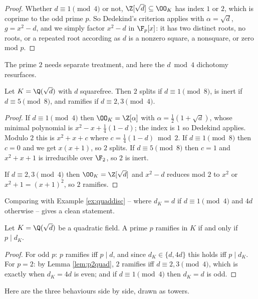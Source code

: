 \begin{proof}
	Whether $d \equiv 1 \pmod 4$ or not, $\Z[\sqrt d] \subseteq \OO_K$ has index $1$ or $2$, which is coprime to the odd prime $p$. So Dedekind's criterion applies with $\alpha = \sqrt d$, $g = x^2-d$, and we simply factor $x^2 - d$ in $\F_p[x]$: it has two distinct roots, no roots, or a repeated root according as $d$ is a nonzero square, a nonsquare, or zero mod $p$.
\end{proof}

The prime $2$ needs separate treatment, and here the $d \bmod 4$ dichotomy resurfaces.

\begin{lemma}\label{lem:p2quad}
	Let $K = \Q(\sqrt d)$ with $d$ squarefree. Then $2$ splits if $d \equiv 1 \pmod 8$, is inert if $d \equiv 5 \pmod 8$, and ramifies if $d \equiv 2,3\pmod 4$.
\end{lemma}

\begin{proof}
	If $d \equiv 1 \pmod 4$ then $\OO_K = \Z[\alpha]$ with $\alpha = \tfrac12(1+\sqrt d)$, whose minimal polynomial is $x^2 - x + \tfrac14(1-d)$; the index is $1$ so Dedekind applies. Modulo $2$ this is $x^2+x+c$ where $c = \tfrac14(1-d) \bmod 2$. If $d \equiv 1 \pmod 8$ then $c = 0$ and we get $x(x+1)$, so $2$ splits. If $d \equiv 5\pmod 8$ then $c = 1$ and $x^2+x+1$ is irreducible over $\F_2$, so $2$ is inert.

	If $d \equiv 2,3\pmod 4$ then $\OO_K = \Z[\sqrt d]$ and $x^2-d$ reduces mod $2$ to $x^2$ or $x^2+1 = (x+1)^2$, so $2$ ramifies.
\end{proof}

Comparing with Example \ref{ex:quaddisc} -- where $d_K = d$ if $d \equiv 1 \pmod 4$ and $4d$ otherwise -- gives a clean statement.

\begin{corollary}\label{cor:quadram}
	Let $K = \Q(\sqrt d)$ be a quadratic field. A prime $p$ ramifies in $K$ if and only if $p \mid d_K$.
\end{corollary}

\begin{proof}
	For odd $p$: $p$ ramifies iff $p \mid d$, and since $d_K \in \{d,4d\}$ this holds iff $p \mid d_K$. For $p = 2$: by Lemma \ref{lem:p2quad}, $2$ ramifies iff $d \equiv 2,3\pmod 4$, which is exactly when $d_K = 4d$ is even; and if $d \equiv 1\pmod 4$ then $d_K = d$ is odd.
\end{proof}

Here are the three behaviours side by side, drawn as towers.

